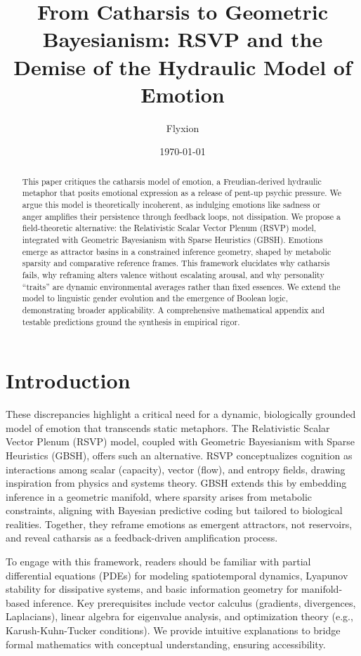 \documentclass[11pt]{article}
\title{From Catharsis to Geometric Bayesianism: RSVP and the Demise of the Hydraulic Model of Emotion}
\author{Flyxion}
\date{\today}
\theoremstyle{plain}
\begin{document}
\maketitle

\begin{abstract}
This paper critiques the catharsis model of emotion, a Freudian-derived hydraulic metaphor that posits emotional expression as a release of pent-up psychic pressure. We argue this model is theoretically incoherent, as indulging emotions like sadness or anger amplifies their persistence through feedback loops, not dissipation. We propose a field-theoretic alternative: the Relativistic Scalar Vector Plenum (RSVP) model, integrated with Geometric Bayesianism with Sparse Heuristics (GBSH). Emotions emerge as attractor basins in a constrained inference geometry, shaped by metabolic sparsity and comparative reference frames. This framework elucidates why catharsis fails, why reframing alters valence without escalating arousal, and why personality “traits” are dynamic environmental averages rather than fixed essences. We extend the model to linguistic gender evolution and the emergence of Boolean logic, demonstrating broader applicability. A comprehensive mathematical appendix and testable predictions ground the synthesis in empirical rigor.
\end{abstract}

\section{Introduction}

These discrepancies highlight a critical need for a dynamic, biologically grounded model of emotion that transcends static metaphors. The Relativistic Scalar Vector Plenum (RSVP) model, coupled with Geometric Bayesianism with Sparse Heuristics (GBSH), offers such an alternative. RSVP conceptualizes cognition as interactions among scalar (capacity), vector (flow), and entropy fields, drawing inspiration from physics and systems theory. GBSH extends this by embedding inference in a geometric manifold, where sparsity arises from metabolic constraints, aligning with Bayesian predictive coding but tailored to biological realities. Together, they reframe emotions as emergent attractors, not reservoirs, and reveal catharsis as a feedback-driven amplification process.

To engage with this framework, readers should be familiar with partial differential equations (PDEs) for modeling spatiotemporal dynamics, Lyapunov stability for dissipative systems, and basic information geometry for manifold-based inference. Key prerequisites include vector calculus (gradients, divergences, Laplacians), linear algebra for eigenvalue analysis, and optimization theory (e.g., Karush-Kuhn-Tucker conditions). We provide intuitive explanations to bridge formal mathematics with conceptual understanding, ensuring accessibility.
\end{document}
